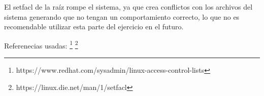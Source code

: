 El setfacl de la raíz rompe el sistema, ya que crea conflictos con los archivos del sistema generando que no tengan un comportamiento correcto, lo que no es recomendable utilizar esta parte del ejercicio en el futuro.

Referenecias usadas: \footnote{https://www.redhat.com/sysadmin/linux-access-control-lists} \footnote{https://linux.die.net/man/1/setfacl}






%



%


